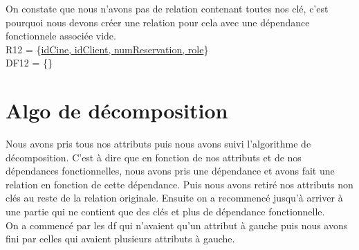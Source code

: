 \documentclass[a4paper,sffamily,12pt]{article}
\begin{document}
				On constate que nous n'avons pas de relation contenant toutes nos clé, c'est pourquoi nous devons créer une relation pour cela avec une dépendance fonctionnele associée vide.\\
											
				\noindent R12 = \{\underline{idCine, idClient, numReservation, role}\} \\ DF12 = \{\} \\

				\vspace{0.5cm}

		\section{Algo de décomposition}

			\vspace{0.5cm}
			
			Nous avons pris tous nos attributs puis nous avons suivi l'algorithme de décomposition. C'est à dire que en fonction de nos attributs et de nos dépendances fonctionnelles, nous avons pris une dépendance et avons fait une relation en fonction de cette dépendance. Puis nous avons retiré nos attributs non clés au reste de la relation originale. Ensuite on a recommencé jusqu'à arriver à une partie qui ne contient que des clés et plus de dépendance fonctionnelle.\\
			\indent On a commencé par les df qui n'avaient qu'un attribut à gauche puis nous avons fini par celles qui avaient plusieurs attributs à gauche.

		\newpage
		
\end{document}

